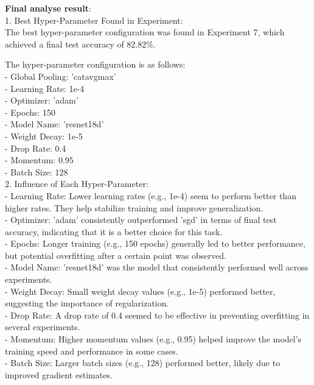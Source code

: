 \documentclass{article}
\begin{document}
\begin{tcolorbox}[enhanced jigsaw,breakable,pad at break*=1mm,
  colback=blue!5!white,colframe=blue!75!black,title=GPT-3.5 Experimental Logs,
  watermark color=white]
\textbf{Final analyse result}:\\
1. Best Hyper-Parameter Found in Experiment: \\
The best hyper-parameter configuration was found in Experiment 7, which achieved a final test accuracy of 82.82\%.

The hyper-parameter configuration is as follows: \\
     - Global Pooling: 'catavgmax' \\
     - Learning Rate: 1e-4 \\
     - Optimizer: 'adam' \\
     - Epochs: 150 \\
     - Model Name: 'resnet18d' \\
     - Weight Decay: 1e-5 \\
     - Drop Rate: 0.4 \\
     - Momentum: 0.95 \\
     - Batch Size: 128 \\

2. Influence of Each Hyper-Parameter: \\
   - Learning Rate: Lower learning rates (e.g., 1e-4) seem to perform better than higher rates. They help stabilize training and improve generalization. \\
   - Optimizer: 'adam' consistently outperformed 'sgd' in terms of final test accuracy, indicating that it is a better choice for this task. \\
   - Epochs: Longer training (e.g., 150 epochs) generally led to better performance, but potential overfitting after a certain point was observed. \\
   - Model Name: 'resnet18d' was the model that consistently performed well across experiments. \\
   - Weight Decay: Small weight decay values (e.g., 1e-5) performed better, suggesting the importance of regularization. \\
   - Drop Rate: A drop rate of 0.4 seemed to be effective in preventing overfitting in several experiments. \\
   - Momentum: Higher momentum values (e.g., 0.95) helped improve the model's training speed and performance in some cases. \\
   - Batch Size: Larger batch sizes (e.g., 128) performed better, likely due to improved gradient estimates. \\


\end{tcolorbox}
\end{document}
